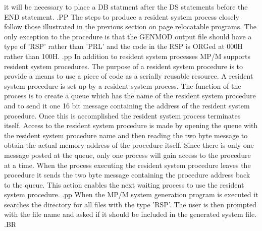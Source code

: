 it will be necessary to place a DB statment after the DS statements
before the END statement.
.PP
The steps to produce a resident system process closely follow
those illustrated in the previous section on page relocatable programs.
The only exception to the procedure is that the GENMOD output file
should have a type of 'RSP' rather than 'PRL' and the code in the
RSP is ORGed at 000H rather than 100H.
.pp
In addition to resident system processes MP/M supports resident system
procedures.  The purpose of a resident system procedure is to
provide a means to use a piece of code as a serially reusable
resource.  A resident system procedure is set up by a resident system
process.  The function of the process is to create a queue which has
the name of the resident system procedure and to send it one 16 bit
message containing the address of the resident system procedure.
Once this is accomplished the resident system process
terminates itself.  Access to the resident system procedure is made by
opening the queue with the resident system procedure name and then
reading the two byte message to obtain the actual memory address of
the procedure itself.
Since there is only one message posted at the queue, only one process
will gain access to the procedure at a time.  When the process
executing the resident system procedure leaves the procedure it
sends the two byte message containing the procedure address back
to the queue.  This action enables the next waiting process to
use the resident system procedure.
.pp
When the MP/M system generation program is executed it searches the
directory for all files with the type 'RSP'.  The user is then
prompted with the file name and asked if it should be included in
the generated system file.
.BR
